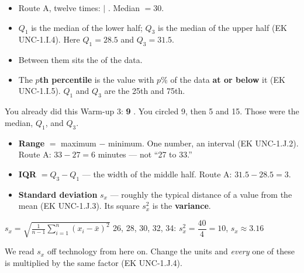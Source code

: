 \documentclass[aspectratio=169, 11pt]{beamer}
\begin{document}
\begin{frame}[t, plain]
  \vspace{4pt}
  \begin{itemize}\setlength{\itemsep}{7pt}
    \item Route A, twelve times:       \; $|$      . \quad Median $= 30$.
    \item \textbf{$Q_1$} is the median of the lower half; \textbf{$Q_3$} is the median of the
          upper half (EK UNC-1.I.4). Here $Q_1 = 28.5$ and $Q_3 = 31.5$.
    \item Between them sits the  of the data.
    \item The \textbf{$p$th percentile} is the value with $p\%$ of the data \textbf{at or
          below} it (EK UNC-1.I.5). $Q_1$ and $Q_3$ are the 25th and 75th.
  \end{itemize}
  \vspace{8pt}
  \begin{block}{You already did this}
    Warm-up 3:    \; \textbf{9}   . \;
    You circled 9, then 5 and 15. Those were the median, $Q_1$, and $Q_3$.
  \end{block}
\end{frame}

\begin{frame}[t, plain]
  \vspace{4pt}
  \begin{itemize}\setlength{\itemsep}{7pt}
    \item \textbf{Range} $=$ maximum $-$ minimum. One number,  an interval
          (EK UNC-1.J.2). Route A: $33-27=6$ minutes --- not ``27 to 33.''
    \item \textbf{IQR} $= Q_3 - Q_1$ --- the width of the middle half. Route A: $31.5 - 28.5 = 3$.
    \item \textbf{Standard deviation} $s_x$ --- roughly the typical distance of a value from
          the mean (EK UNC-1.J.3). Its square $s_x^2$ is the \textbf{variance}.
  \end{itemize}
  \vspace{6pt}
  \begin{center}
    $\displaystyle s_x = \sqrt{\frac{1}{n-1}\sum_{i=1}^{n}(x_i-\bar x)^2}$
    \qquad\qquad
    {\small 26, 28, 30, 32, 34: \; $s_x^2 = \dfrac{40}{4} = 10$, \; $s_x \approx 3.16$}
  \end{center}
  \vspace{4pt}
  {\small\color{slate} We read $s_x$ off technology from here on. Change the units and
  \emph{every} one of these is multiplied by the same factor (EK UNC-1.J.4).}
\end{frame}
\end{document}
